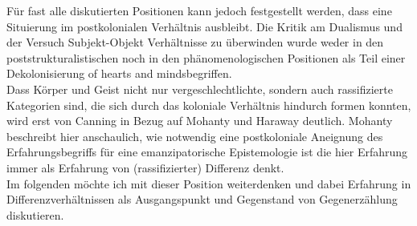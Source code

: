 \noindent Für fast alle diskutierten Positionen kann jedoch festgestellt werden, dass
eine Situierung im postkolonialen Verhältnis ausbleibt. Die Kritik am Dualismus
und der Versuch Subjekt-Objekt Verhältnisse zu überwinden wurde weder in den
poststrukturalistischen noch in den phänomenologischen Positionen als Teil
einer Dekolonisierung \glqq of hearts and minds\grqq  begriffen.\\
Dass Körper und Geist
nicht nur vergeschlechtlichte, sondern auch rassifizierte Kategorien sind, die
sich durch das koloniale Verhältnis hindurch formen konnten, wird erst von
Canning in Bezug auf Mohanty und Haraway deutlich. Mohanty beschreibt hier
anschaulich, wie notwendig eine postkoloniale Aneignung des Erfahrungsbegriffs
für eine emanzipatorische Epistemologie ist die hier Erfahrung immer als
Erfahrung von (rassifizierter) Differenz denkt.\\

\noindent Im folgenden möchte ich mit dieser Position weiterdenken und dabei Erfahrung in
Differenzverhältnissen als Ausgangspunkt und Gegenstand von Gegenerzählung diskutieren.
